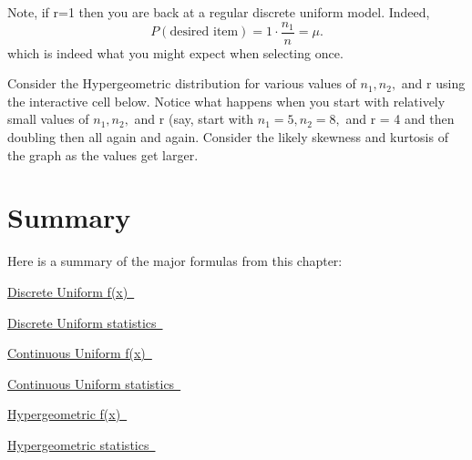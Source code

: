 \documentclass[10pt,]{book}
\numberwithin{equation}{section}
\begin{document}
%
\par
\hypertarget{p-814}{}%
Note, if r=1 then you are back at a regular discrete uniform model. Indeed,%
\begin{equation*}
P(\text{desired item}) = 1 \cdot \frac{n_1}{n} = \mu .
\end{equation*}
which is indeed what you might expect when selecting once.%
\par
\hypertarget{p-815}{}%
Consider the Hypergeometric distribution for various values of \(n_1, n_2,\) and r using the interactive cell below. Notice what happens when you start with relatively small values of \(n_1, n_2,\) and r (say, start with \(n_1 = 5, n_2 = 8,\) and r = 4 and then doubling then all again and again. Consider the likely skewness and kurtosis of the graph as the values get larger.%
%
%
\typeout{************************************************}
\typeout{************************************************}
%
\section[{Summary}]{Summary}\label{section-43}
\hypertarget{p-816}{}%
\hypertarget{p-817}{}%
Here is a summary of the major formulas from this chapter:%
%
\par
\hypertarget{p-818}{}%
\hyperlink{DiscreteUniformFunction}{Discrete Uniform f(x)~}%
\par
\hypertarget{p-819}{}%
\hyperlink{DiscreteUniformProperties}{Discrete Uniform statistics~}%
\par
\hypertarget{p-820}{}%
\hyperlink{ContinuousUniformFunction}{Continuous Uniform f(x)~}%
\par
\hypertarget{p-821}{}%
\hyperlink{ContinuousUniformProperties}{Continuous Uniform statistics~}%
\par
\hypertarget{p-822}{}%
\hyperlink{HypergeometricFunction}{Hypergeometric f(x)~}%
\par
\hypertarget{p-823}{}%
\hyperlink{HypergeometricProperties}{Hypergeometric statistics~}%
%
%
\typeout{************************************************}
\typeout{************************************************}
%
\end{document}
